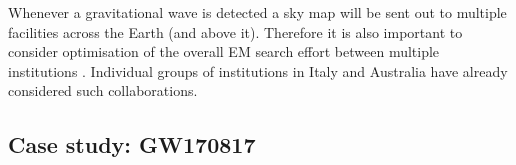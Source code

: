 \begin{colsection}
\begin{colsection}
Whenever a gravitational wave is detected a sky map will be sent out to multiple facilities across the Earth (and above it). Therefore it is also important to consider optimisation of the overall EM search effort between multiple institutions \citep{LIGO-optimal,LIGO-optimal2}. Individual groups of institutions in Italy \citep{LIGO-italy} and Australia \citep{LIGO-aus} have already considered such collaborations. 

\end{colsection}


\subsection{Case study: GW170817}
\label{sec:gw170817}
\begin{colsection}


\end{colsection}


\end{colsection}


\newpage
